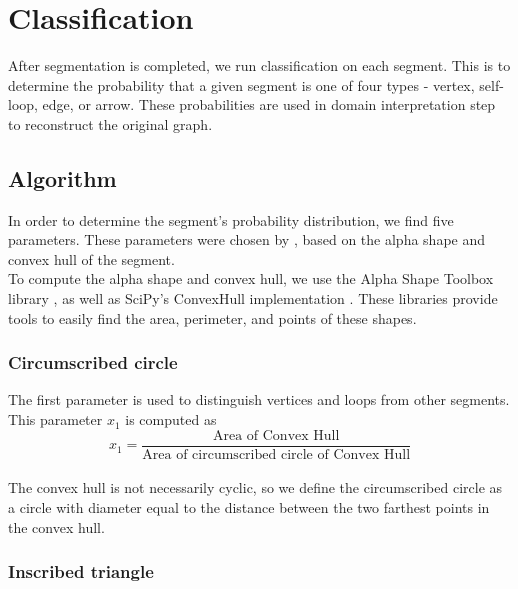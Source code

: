 \section{Classification}

After segmentation is completed, we run classification on each segment. This is to determine the probability that a given segment is one of four types - vertex, self-loop, edge, or arrow. These probabilities are used in domain interpretation step to reconstruct the original graph. 

\subsection{Algorithm}

In order to determine the segment's probability distribution, we find five parameters. These parameters were chosen by \citeauthor{daly2015hand} \cite{daly2015hand}, based on the alpha shape and convex hull of the segment. \\ 

To compute the alpha shape and convex hull, we use the Alpha Shape Toolbox library \cite{alphashapetoolbox}, as well as SciPy's ConvexHull implementation \cite{scipy}. These libraries provide tools to easily find the area, perimeter, and points of these shapes. \\

\subsubsection{Circumscribed circle}

The first parameter is used to distinguish vertices and loops from other segments. This parameter $x_1$ is computed as \\

\begin{equation}
	x_1 = \frac{\text{Area of Convex Hull}}{\text{Area of circumscribed circle of Convex Hull}}
\end{equation} \\

The convex hull is not necessarily cyclic, so we define the circumscribed circle as a circle with diameter equal to the distance between the two farthest points in the convex hull. \\

\subsubsection{Inscribed triangle}

